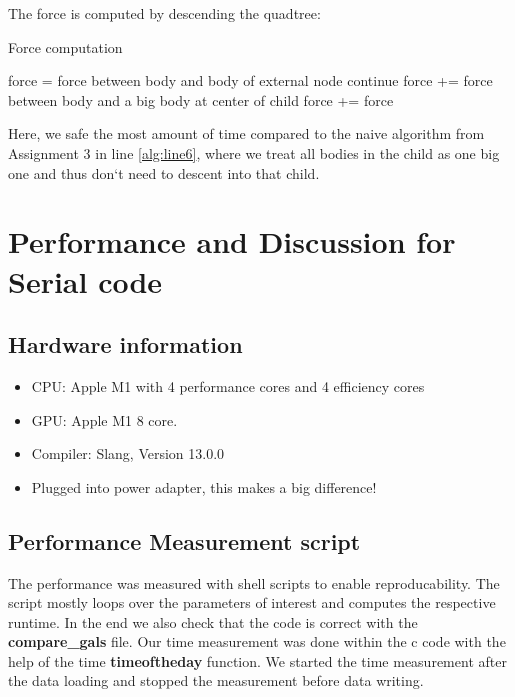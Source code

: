 \documentclass[a4paper]{scrartcl}
\begin{document}
        The force is computed by descending the quadtree:
        \begin{algorithm}[H]
            \caption{Force computation}\label{alg:compute_force}
            \begin{algorithmic}[1]
                \State force = force between body and body of external node
            \Else      
                        \State continue
                    \EndIf
                    \label{alg:line6}
                        \State force += force between body and a big body at center of child
                        \State force += 
                    \EndIf
            \EndFor
            \EndIf
            \State \Return force
            \EndProcedure
            \end{algorithmic}
        \end{algorithm}
        Here, we safe the most amount of time compared to the naive algorithm
        from Assignment 3 in line \ref{alg:line6}, where we treat all bodies in the child as
        one big one and thus don`t need to descent into that child.


\section{Performance and Discussion for Serial code}
    \subsection{Hardware information}
        \begin{itemize}
            \item CPU: Apple M1 with 4 performance cores and 4 efficiency cores
            \item GPU: Apple M1 8 core.
            \item Compiler: Slang, Version 13.0.0
            \item Plugged into power adapter, this makes a big difference!
        \end{itemize}

    \subsection{Performance Measurement script}
        The performance was measured with shell scripts to enable
        reproducability. The script mostly loops over the parameters of interest
        and computes the respective runtime. In the end we also check that the
        code is correct with the \textbf{compare\_gals} file. Our time
        measurement was done within the c code with the help of the time
        \textbf{timeoftheday} function. We started the time measurement after
        the data loading and stopped the measurement before data writing.
\end{document}
